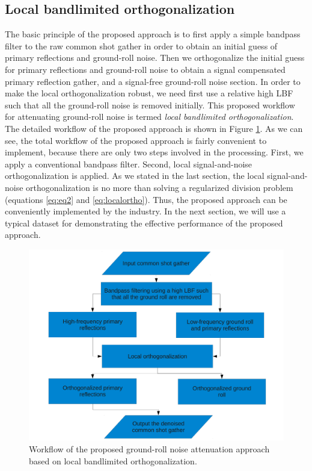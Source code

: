 \subsection{Local bandlimited orthogonalization}
The basic principle of the proposed approach is to first apply a simple bandpass filter to the raw common shot gather in order to obtain an initial guess of primary reflections and ground-roll noise. Then we orthogonalize the initial guess for primary reflections and ground-roll noise to obtain a signal compensated primary reflection gather, and a signal-free ground-roll noise section. In order to make the local orthogonalization robust, we need first use a relative high LBF such that all the ground-roll noise is removed initially. This proposed workflow for attenuating ground-roll noise is termed \emph{local bandlimited orthogonalization}. The detailed workflow of the proposed approach is shown in Figure \ref{fig:flowchart}. As we can see, the total workflow of the proposed approach is fairly convenient to implement, because there are only two steps involved in the processing. First, we apply a conventional bandpass filter. Second, local signal-and-noise orthogonalization is applied. As we stated in the last section, the local signal-and-noise orthogonalization is no more than solving a regularized division problem (equations \ref{eq:eq2} and \ref{eq:localortho}). Thus, the proposed approach can be conveniently implemented by the industry. In the next section, we will use a typical dataset for demonstrating the effective performance of the proposed approach.
\begin{figure}[htb!]
  \centering
    \includegraphics[width=0.8\columnwidth]{Fig/flowchart}
	\caption{Workflow of the proposed ground-roll noise attenuation approach based on local bandlimited orthogonalization.}
   \label{fig:flowchart}
\end{figure}
